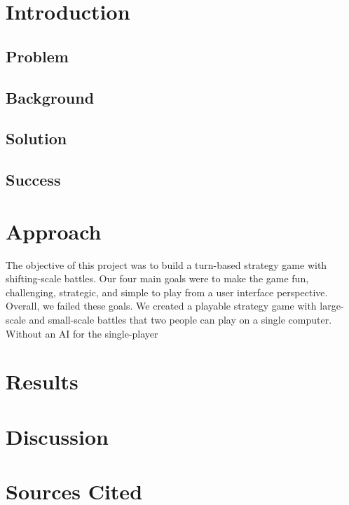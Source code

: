 \documentclass{article}
\begin{document}
\clearpage

\section*{Introduction}

\subsection*{Problem}

\subsection*{Background}

\subsection*{Solution}

\subsection*{Success}

\section*{Approach}
The objective of this project was to build a turn-based strategy game with shifting-scale battles.
Our four main goals were to make the game fun, challenging, strategic, and simple to play from a user interface perspective.
Overall, we failed these goals.
We created a playable strategy game with large-scale and small-scale battles that two people can play on a single computer.
Without an AI for the single-player

\section*{Results}

\section*{Discussion}

\section*{Sources Cited}
\end{document}

